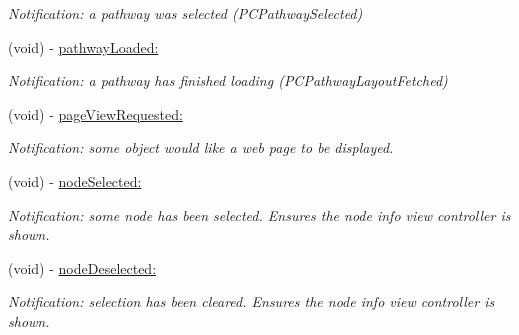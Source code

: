 \begin{Indent}
\begin{DoxyCompactItemize}
\begin{DoxyCompactList}\small\item\em Notification: a pathway was selected (PCPathwaySelected) \end{DoxyCompactList}\item 
\hypertarget{interface_p_c_detail_view_controller_a98cd3b43ed9edadc9d65c4d8ff540c64}{
(void) -\/ \hyperlink{interface_p_c_detail_view_controller_a98cd3b43ed9edadc9d65c4d8ff540c64}{pathwayLoaded:}}
\label{interface_p_c_detail_view_controller_a98cd3b43ed9edadc9d65c4d8ff540c64}

\begin{DoxyCompactList}\small\item\em Notification: a pathway has finished loading (PCPathwayLayoutFetched) \end{DoxyCompactList}\item 
\hypertarget{interface_p_c_detail_view_controller_a8671ae06441374d937fbef7f43ec6723}{
(void) -\/ \hyperlink{interface_p_c_detail_view_controller_a8671ae06441374d937fbef7f43ec6723}{pageViewRequested:}}
\label{interface_p_c_detail_view_controller_a8671ae06441374d937fbef7f43ec6723}

\begin{DoxyCompactList}\small\item\em Notification: some object would like a web page to be displayed. \end{DoxyCompactList}\item 
\hypertarget{interface_p_c_detail_view_controller_a137da72dd223ec5deec90d3705f3e9f1}{
(void) -\/ \hyperlink{interface_p_c_detail_view_controller_a137da72dd223ec5deec90d3705f3e9f1}{nodeSelected:}}
\label{interface_p_c_detail_view_controller_a137da72dd223ec5deec90d3705f3e9f1}

\begin{DoxyCompactList}\small\item\em Notification: some node has been selected. Ensures the node info view controller is shown. \end{DoxyCompactList}\item 
\hypertarget{interface_p_c_detail_view_controller_a10e84e12b6660fa18abed4a2e3a0ace6}{
(void) -\/ \hyperlink{interface_p_c_detail_view_controller_a10e84e12b6660fa18abed4a2e3a0ace6}{nodeDeselected:}}
\label{interface_p_c_detail_view_controller_a10e84e12b6660fa18abed4a2e3a0ace6}

\begin{DoxyCompactList}\small\item\em Notification: selection has been cleared. Ensures the node info view controller is shown. \end{DoxyCompactList}\end{DoxyCompactItemize}
\end{Indent}
